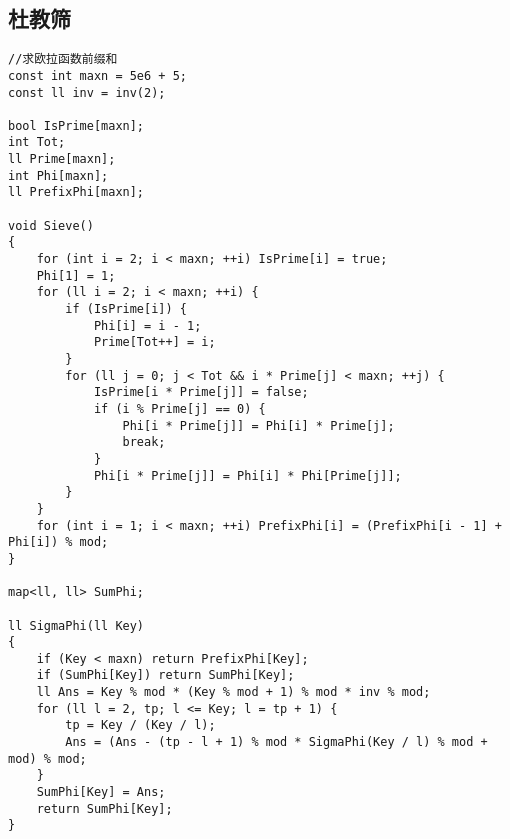 \documentclass[twocolumn,a4]{article}
\begin{document}
\subsection{杜教筛}
\begin{lstlisting}
//求欧拉函数前缀和
const int maxn = 5e6 + 5;
const ll inv = inv(2);

bool IsPrime[maxn];
int Tot;
ll Prime[maxn];
int Phi[maxn];
ll PrefixPhi[maxn];

void Sieve()
{
    for (int i = 2; i < maxn; ++i) IsPrime[i] = true;
    Phi[1] = 1;
    for (ll i = 2; i < maxn; ++i) {
        if (IsPrime[i]) {
            Phi[i] = i - 1;
            Prime[Tot++] = i;
        }
        for (ll j = 0; j < Tot && i * Prime[j] < maxn; ++j) {
            IsPrime[i * Prime[j]] = false;
            if (i % Prime[j] == 0) {
                Phi[i * Prime[j]] = Phi[i] * Prime[j];
                break;
            }
            Phi[i * Prime[j]] = Phi[i] * Phi[Prime[j]];
        }
    }
    for (int i = 1; i < maxn; ++i) PrefixPhi[i] = (PrefixPhi[i - 1] + Phi[i]) % mod;
}

map<ll, ll> SumPhi;

ll SigmaPhi(ll Key)
{
    if (Key < maxn) return PrefixPhi[Key];
    if (SumPhi[Key]) return SumPhi[Key];
    ll Ans = Key % mod * (Key % mod + 1) % mod * inv % mod;
    for (ll l = 2, tp; l <= Key; l = tp + 1) {
        tp = Key / (Key / l);
        Ans = (Ans - (tp - l + 1) % mod * SigmaPhi(Key / l) % mod + mod) % mod;
    }
    SumPhi[Key] = Ans;
    return SumPhi[Key];
}
\end{lstlisting}
\end{document}

